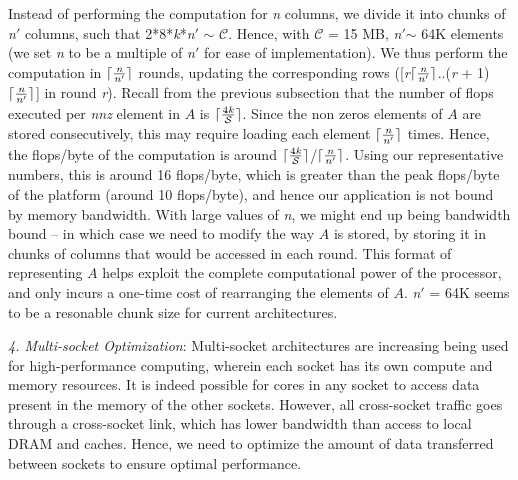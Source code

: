      Instead of performing the computation for {\it{n}} columns, we
     divide it into chunks of {\it{n}}$'$ columns, such that
     2*8*{\it{k}}*{\it{n}}$'$ $\sim$ $\mathcal{C}$. Hence, with
     $\mathcal{C}$ = 15 MB,  {\it{n}}$'$$\sim$ 64K elements (we set
     {\it{n}} to be a multiple of {\it{n}}$'$ for ease of
     implementation). We thus perform the computation in
     $\lceil\frac{\it{n}}{\it{n}'}\rceil$ rounds, 
     updating the corresponding rows
     ([{\it{r}}$\lceil\frac{\it{n}}{\it{n}'}\rceil$..({\it{r}} +
     1)$\lceil\frac{\it{n}}{\it{n}'}\rceil$]
     in round {\it{r}}).
     Recall from the previous subsection that the number of flops
     executed per {\it{nnz}} element in $A$ is
     $\lceil\frac{4{\it{k}}}{\mathcal{S}}\rceil$.
     Since the non zeros elements of $A$ are stored consecutively, 
     this may require loading each element
     $\lceil\frac{\it{n}}{\it{n}'}\rceil$ times. Hence, the flops/byte
     of the computation is around
     $\lceil\frac{4{\it{k}}}{\mathcal{S}}\rceil$/$\lceil\frac{\it{n}}{\it{n}'}\rceil$.
     Using our representative numbers, this is around 16 flops/byte,
     which is greater than the peak flops/byte of the platform (around
     10 flops/byte), and
     hence our application is not bound by memory bandwidth. With
     large values of {\it{n}}, we might end up being bandwidth bound
     -- in which case we need to modify the way $A$ is stored, by
     storing it in chunks of columns that would be accessed in each
     round. This format of representing $A$  helps 
     exploit the complete computational power of the processor, 
     and only incurs a
     one-time cost of rearranging  the elements of $A$.
     {\it{n}}$'$ = 64K seems to be a resonable chunk size for current
     architectures.

     

     \vspace*{0.1in}
     {\it{4. Multi-socket Optimization}}: 
     Multi-socket architectures are increasing being used for
     high-performance computing, wherein each socket has its own
     compute and memory resources. It is indeed possible for cores in
     any socket to access data present in the memory of the other
     sockets. However, all cross-socket traffic goes through a
     cross-socket link, which has lower bandwidth than access to local
     DRAM and caches. Hence, we need to optimize the amount of data
     transferred between sockets to ensure optimal performance.

